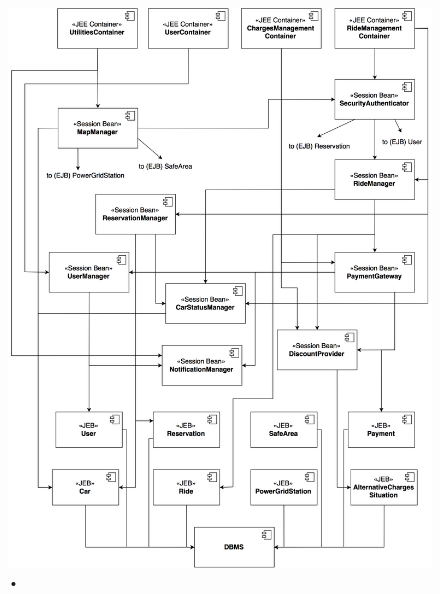 \begin{figure}[H]
\begin{center}
		\includegraphics[width=\textwidth]{./integration_strategy/diagrams/overall.png}
		\caption{•}
\end{center}
\end{figure}

